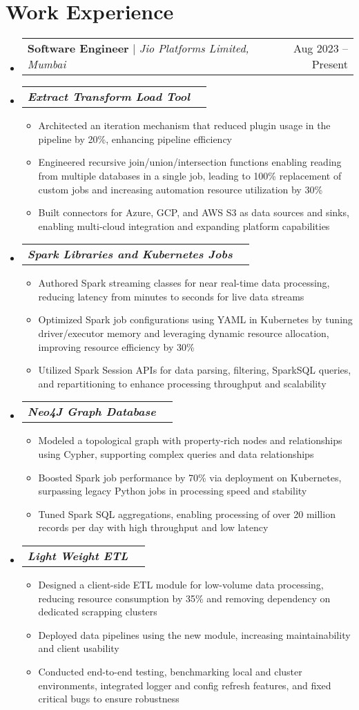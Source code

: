 \documentclass[letterpaper,11pt]{article}
\makeatletter
\newcommand{\resumeItem}[1]{
  \item\small{
    {#1 \vspace{-2pt}}
  }
}
\newcommand{\resumeSubheading}[4]{
  \vspace{-2pt}\item
    \begin{tabular*}{0.97\textwidth}[t]{l@{\extracolsep{\fill}}r}
      \textbf{#1} & #2 \\
      \textit{\small#3} & \textit{\small #4} \\
    \end{tabular*}\vspace{-7pt}
}
\newcommand{\resumeSubSubheading}[2]{
    \item
    \begin{tabular*}{0.97\textwidth}{l@{\extracolsep{\fill}}r}
      \textit{\small#1} & \textit{\small #2} \\
    \end{tabular*}\vspace{-7pt}
}
\newcommand{\resumeProjectHeading}[2]{
    \item
    \begin{tabular*}{0.97\textwidth}{l@{\extracolsep{\fill}}r}
      \small#1 & #2 \\
    \end{tabular*}\vspace{-7pt}
}
\newcommand{\resumeSubHeadingListStart}{\begin{itemize}[leftmargin=0.15in, label={}]}
\newcommand{\resumeSubHeadingListEnd}{\end{itemize}}
\newcommand{\resumeItemListStart}{\begin{itemize}}
\newcommand{\resumeItemListEnd}{\end{itemize}\vspace{-5pt}}
\makeatother
\begin{document}
\section{Work Experience}
    \resumeSubHeadingListStart
    \resumeProjectHeading
          {\textbf{Software Engineer} $|$ \emph{Jio Platforms Limited, Mumbai}}{Aug 2023 -- Present}
        \resumeSubSubheading{\textbf{ Extract Transform Load Tool}}{}
          \resumeItemListStart
            \resumeItem{Architected an iteration mechanism that reduced plugin usage in the pipeline by 20\%, enhancing pipeline efficiency}
            \resumeItem{Engineered recursive join/union/intersection functions enabling reading from multiple databases in a single job, leading to 100\% replacement of custom jobs and increasing automation resource utilization by 30\%}
            \resumeItem{Built connectors for Azure, GCP, and AWS S3 as data sources and sinks, enabling multi-cloud integration and expanding platform capabilities}
        \resumeItemListEnd 
        \resumeSubSubheading{\textbf{ Spark Libraries and Kubernetes Jobs}}{}
          \resumeItemListStart
           \resumeItem{Authored Spark streaming classes for near real-time data processing, reducing latency from minutes to seconds for live data streams}
           \resumeItem{Optimized Spark job configurations using YAML in Kubernetes by tuning driver/executor memory and leveraging dynamic resource allocation, improving resource efficiency by 30\%}
            \resumeItem{Utilized Spark Session APIs for data parsing, filtering, SparkSQL queries, and repartitioning to enhance processing throughput and scalability}
          \resumeItemListEnd 
        \resumeSubSubheading{\textbf{ Neo4J Graph Database}}{}
          \resumeItemListStart           
          \resumeItem{Modeled a topological graph with property-rich nodes and relationships using Cypher, supporting complex queries and data relationships}
           \resumeItem{Boosted Spark job performance by 70\% via deployment on Kubernetes, surpassing legacy Python jobs in processing speed and stability}
            \resumeItem{Tuned Spark SQL aggregations, enabling processing of over 20 million records per day with high throughput and low latency}
          \resumeItemListEnd
        \resumeSubSubheading{\textbf{ Light Weight ETL}}{}
          \resumeItemListStart
           \resumeItem{Designed a client-side ETL module for low-volume data processing, reducing resource consumption by 35\% and removing dependency on dedicated scrapping clusters}
        \resumeItem{Deployed data pipelines using the new module, increasing maintainability and client usability}
        \resumeItem{Conducted end-to-end testing, benchmarking local and cluster environments, integrated logger and config refresh features, and fixed critical bugs to ensure robustness}
          \resumeItemListEnd
    \resumeSubHeadingListEnd
\end{document}
